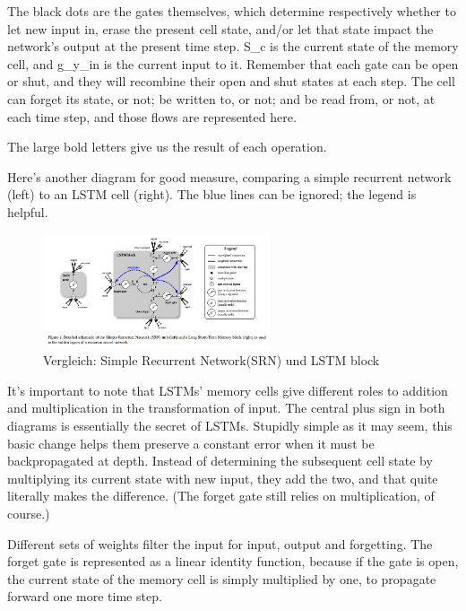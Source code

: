 {The black dots are the gates themselves, which determine respectively whether to let new input in, erase the present cell state, and/or let that state impact the network’s output at the present time step. S\_c is the current state of the memory cell, and g\_y\_in is the current input to it. Remember that each gate can be open or shut, and they will recombine their open and shut states at each step. The cell can forget its state, or not; be written to, or not; and be read from, or not, at each time step, and those flows are represented here.

The large bold letters give us the result of each operation.

Here’s another diagram for good measure, comparing a simple recurrent network (left) to an LSTM cell (right). The blue lines can be ignored; the legend is helpful.

\renewcommand{\figurename}{Abb.}
\begin{figure}[htp]
\centering
\includegraphics[width=0.60\textwidth]{pictures/greff_lstm_diagram.png}
\caption[Vergleich Recurrent Network und LSTM]{Vergleich: Simple Recurrent Network(SRN) und LSTM block\protect\footnotemark}
\end{figure}

It’s important to note that LSTMs’ memory cells give different roles to addition and multiplication in the transformation of input. The central plus sign in both diagrams is essentially the secret of LSTMs. Stupidly simple as it may seem, this basic change helps them preserve a constant error when it must be backpropagated at depth. Instead of determining the subsequent cell state by multiplying its current state with new input, they add the two, and that quite literally makes the difference. (The forget gate still relies on multiplication, of course.)

Different sets of weights filter the input for input, output and forgetting. The forget gate is represented as a linear identity function, because if the gate is open, the current state of the memory cell is simply multiplied by one, to propagate forward one more time step.

}
